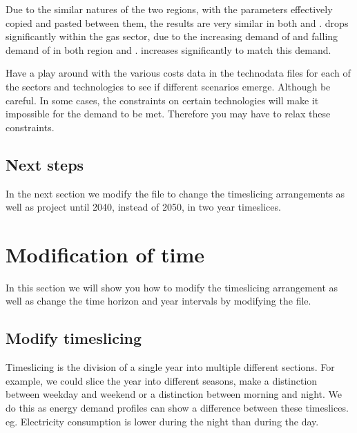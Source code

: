 \documentclass[letterpaper,10pt,english]{sphinxmanual}
\begin{document}
Due to the similar natures of the two regions, with the parameters effectively copied and pasted between them, the results are very similar in both  and .  drops significantly within the gas sector, due to the increasing demand of  and falling demand of  in both region  and .  increases significantly to match this  demand.

Have a play around with the various costs data in the technodata files for each of the sectors and technologies to see if different scenarios emerge. Although be careful. In some cases, the constraints on certain technologies will make it impossible for the demand to be met. Therefore you may have to relax these constraints.


\subsection{Next steps}
\label{\detokenize{user-guide/add-region:Next-steps}}
In the next section we modify the  file to change the timeslicing arrangements as well as project until 2040, instead of 2050, in two year timeslices.


\section{Modification of time}
\label{\detokenize{user-guide/modify-timing-data:Modification-of-time}}\label{\detokenize{user-guide/modify-timing-data::doc}}
In this section we will show you how to modify the timeslicing arrangement as well as change the time horizon and year intervals by modifying the  file.


\subsection{Modify timeslicing}
\label{\detokenize{user-guide/modify-timing-data:Modify-timeslicing}}
Timeslicing is the division of a single year into multiple different sections. For example, we could slice the year into different seasons, make a distinction between weekday and weekend or a distinction between morning and night. We do this as energy demand profiles can show a difference between these timeslices. eg. Electricity consumption is lower during the night than during the day.
\end{document}
